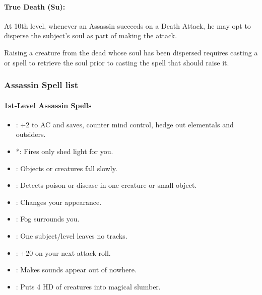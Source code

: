 \paragraph{True Death (Su):}
At 10th level, whenever an Assassin succeeds on a Death Attack, he may opt to disperse the subject's soul as part of making the attack.

Raising a creature from the dead whose soul has been dispersed requires casting a  or  
spell to retrieve the soul prior to casting the spell that should raise it.

\subsubsection{Assassin Spell list}
\paragraph{1st-Level Assassin Spells}
\begin{itemize}
\item {}: +2 to AC and saves, counter mind control, hedge out elementals and outsiders.
\item {}*: Fires only shed light for you.
\item {}: Objects or creatures fall slowly.
\item {}: Detects poison or disease in one creature or small object.
\item {}: Changes your appearance.
\item {}: Fog surrounds you.
\item {}: One subject/level leaves no tracks.
\item {}: +20 on your next attack roll.
\item {}: Makes sounds appear out of nowhere.
\item {}: Puts 4 HD of creatures into magical slumber.
\end{itemize}
